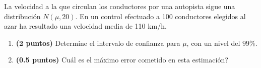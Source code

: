 
La velocidad a la que circulan los conductores por una autopista sigue una distribución $N(\mu,20)$. En un control efectuado a 100 conductores elegidos al azar ha resultado una velocidad media de 110 km/h.
\begin{enumerate}[label=\alph*)]
\item \textbf{(2 puntos)} Determine el intervalo de confianza para $\mu$, con un nivel del $99\%$.
\item \textbf{(0.5 puntos)} \textquestiondown{}Cuál es el máximo error cometido en esta estimación?
\end{enumerate}
